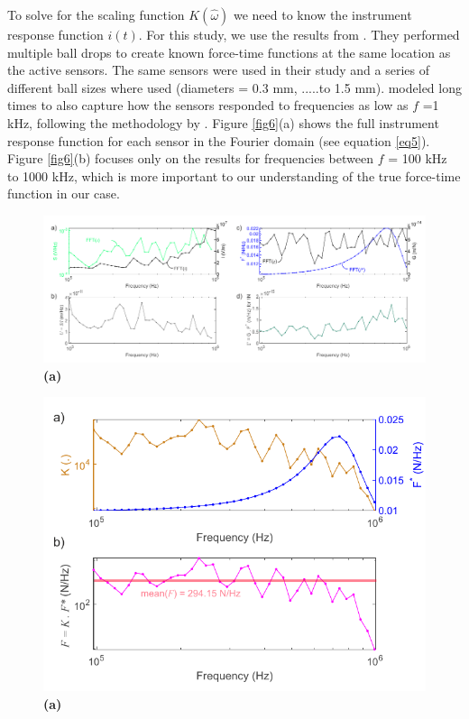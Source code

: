 \documentclass[preprint,3p, 11pt,authoryear]{elsarticle}
\begin{document}
{To solve for the scaling function $K(\hat{\omega})$ we need to know the instrument response function $i(t)$. For this study, we use the results from \citet{Wu2020}. They performed multiple ball drops to create known force-time functions at the same location as the active sensors. The same sensors were used in their study and a series of different ball sizes where used (diameters = 0.3 mm, .....to 1.5 mm).  \citet{Wu2020} modeled long times to also capture how the sensors responded to frequencies as low as $f$ =1 kHz, following the methodology by \citet{Wu2018}.  Figure \ref{fig6}(a) shows the full instrument response function for each sensor in the Fourier domain (see equation \ref{eq5}).  Figure \ref{fig6}(b) focuses only on the results for frequencies between $f$ = 100 kHz to 1000 kHz, which is more important to our understanding of the true force-time function in our case.  



\begin{figure}[ht]
     	\centering
\includegraphics[scale= 1]{FIG7.pdf} 
\caption{\textbf{(a)}  }
	\label{fig7} 
\end{figure}


\begin{figure}[ht]
     	\centering
\includegraphics[scale= 1]{FIG8.pdf} 
\caption{\textbf{(a)}  }
	\label{fig8} 
\end{figure}


}
\end{document}
